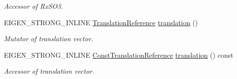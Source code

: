 \begin{DoxyCompactItemize}
\begin{DoxyCompactList}\small\item\em Accessor of Rx\+S\+O3. \end{DoxyCompactList}\item 
E\+I\+G\+E\+N\+\_\+\+S\+T\+R\+O\+N\+G\+\_\+\+I\+N\+L\+I\+NE \hyperlink{class_eigen_1_1_map_3_01_sophus_1_1_sim3_group_3_01___scalar_01_4_00_01___options_01_4_ac20dcaba9f5cca24de324bbd62cb6024}{Translation\+Reference} \hyperlink{class_eigen_1_1_map_3_01_sophus_1_1_sim3_group_3_01___scalar_01_4_00_01___options_01_4_a5c3730af1c036d3dd13b8158fb0a10fa}{translation} ()\hypertarget{class_eigen_1_1_map_3_01_sophus_1_1_sim3_group_3_01___scalar_01_4_00_01___options_01_4_a5c3730af1c036d3dd13b8158fb0a10fa}{}\label{class_eigen_1_1_map_3_01_sophus_1_1_sim3_group_3_01___scalar_01_4_00_01___options_01_4_a5c3730af1c036d3dd13b8158fb0a10fa}

\begin{DoxyCompactList}\small\item\em Mutator of translation vector. \end{DoxyCompactList}\item 
E\+I\+G\+E\+N\+\_\+\+S\+T\+R\+O\+N\+G\+\_\+\+I\+N\+L\+I\+NE \hyperlink{class_eigen_1_1_map_3_01_sophus_1_1_sim3_group_3_01___scalar_01_4_00_01___options_01_4_a922a4d47116d43b66cc711cbe71b2b29}{Const\+Translation\+Reference} \hyperlink{class_eigen_1_1_map_3_01_sophus_1_1_sim3_group_3_01___scalar_01_4_00_01___options_01_4_a076e842c0bdc2ee23efd660bb53720d6}{translation} () const \hypertarget{class_eigen_1_1_map_3_01_sophus_1_1_sim3_group_3_01___scalar_01_4_00_01___options_01_4_a076e842c0bdc2ee23efd660bb53720d6}{}\label{class_eigen_1_1_map_3_01_sophus_1_1_sim3_group_3_01___scalar_01_4_00_01___options_01_4_a076e842c0bdc2ee23efd660bb53720d6}

\begin{DoxyCompactList}\small\item\em Accessor of translation vector. \end{DoxyCompactList}\end{DoxyCompactItemize}
